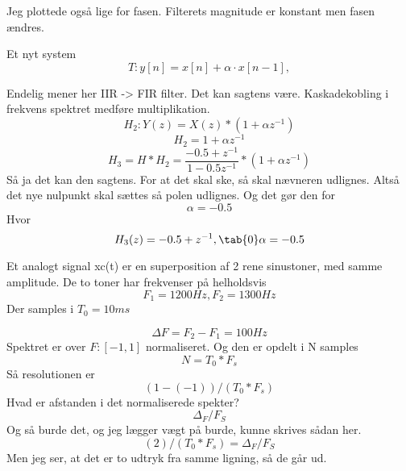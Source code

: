 \begin{rubrik}
\begin{eksamensOpgave}
\begin{UnderOpgave}
        \end{UnderOpgave}
        \begin{UnderOpgave}[Skitser magnituden evalueret i $z=e^{j\omega}$]
            Jeg plottede også lige for fasen. Filterets magnitude er konstant men fasen ændres.
        \end{UnderOpgave}
        Et nyt system 
        \[T\colon y[n]=x[n]+\alpha\cdot x[n - 1],\]
        \begin{UnderOpgave}
            Endelig mener her IIR -> FIR filter. 
            Det kan sagtens være. Kaskadekobling i frekvens spektret medføre multiplikation. 
            \[H_2 : Y(z) = X(z)*(1 + \alpha z^{-1})\]
            \[H_2 = 1 + \alpha z^{-1}\]
            \[H_3 = H * H_2 = \frac{-0.5 + z^{-1}}{1 - 0.5z^{-1}} * (1 + \alpha z^{-1})\]
            Så ja det kan den sagtens. For at det skal ske, så skal nævneren udlignes. Altså det nye nulpunkt skal sættes så polen udlignes. 
            Og det gør den for
            \[\alpha = -0.5\]
            Hvor 
            \[H_3(z) = -0.5 + z^{-1}, \tab{0} \alpha = -0.5\]
        \end{UnderOpgave}
    \end{eksamensOpgave}

    \begin{eksamensOpgave}
        Et analogt signal xc(t) er en superposition af 2 rene sinustoner, med samme amplitude. De to toner har frekvenser på helholdsvis 
        \[F_1 = 1200Hz, F_2 = 1300Hz\]
        Der samples i $T_0 = 10ms$
        \begin{UnderOpgave}
            \[\Delta F = F_2 - F_1 = 100Hz\]
            Spektret er over $F: [-1, 1]$ normaliseret. 
            Og den er opdelt i N samples 
            \[N = T_0 * F_s\]
            Så resolutionen er 
            \[(1 - (-1))/(T_0 * F_s)\]
            Hvad er afstanden i det normaliserede spekter? 
            \[\Delta_F/F_S\] 
            Og så burde det, og jeg lægger vægt på burde, kunne skrives sådan her.
            \[(2)/(T_0 * F_s) = \Delta_F/F_S\]
            Men jeg ser, at det er to udtryk fra samme ligning, så de går ud. 
            

\end{UnderOpgave}
\end{eksamensOpgave}
\end{rubrik}
